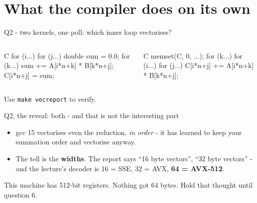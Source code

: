 \documentclass[aspectratio=169]{beamer}
\begin{document}
\section{What the compiler does on its own}

\begin{frame}[fragile]{Q2 - two kernels, one poll: which inner loop vectorises?}
  \begin{columns}[T,onlytextwidth]
      \begin{cookiecode}[title={naive: inner loop is a reduction}]{C}
for (i...)
  for (j...) {
    double sum = 0.0;
    for (k...)
      sum += A[i*n+k] * B[k*n+j];
    C[i*n+j] = sum;
  }
      \end{cookiecode}
      \begin{cookiecode}[title={flip-k: inner loop is n independent updates}]{C}
memset(C, 0, ...);
for (k...)
  for (i...)
    for (j...)
      C[i*n+j] +=
        A[i*n+k] * B[k*n+j];
      \end{cookiecode}
  \end{columns}
  \medskip
  Use \texttt{make vecreport} to verify.
\end{frame}

\begin{frame}{Q2, the reveal: both - and that is not the interesting part}
  \begin{itemize}\setlength\itemsep{6pt}
    \item gcc 15 vectorises even the reduction, \emph{in order} - it has
      learned to keep your summation order and vectorise anyway.
    \item The tell is the \textbf{widths}. The report says ``16 byte
      vectors'', ``32 byte vectors'' - and the lecture's decoder is
      16 = SSE, 32 = AVX, \textbf{64 = AVX-512}.
  \end{itemize}
  \bigskip
  \begin{block}{This machine has 512-bit registers. Nothing got 64 bytes.}
    Hold that thought until question 6.
  \end{block}
\end{frame}
\end{document}
